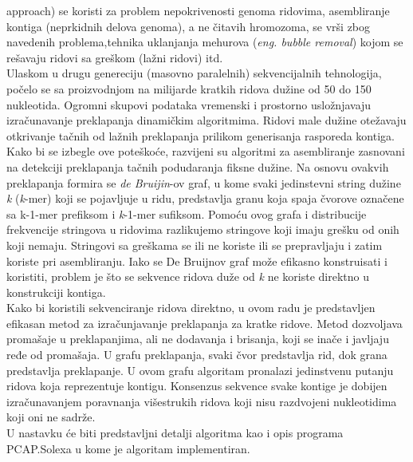 \documentclass[a4paper]{article}
\begin{document}
{{approach}) se koristi za problem nepokrivenosti genoma ridovima, asembliranje kontiga (neprkidnih delova genoma), a ne čitavih hromozoma, se vrši zbog navedenih problema,tehnika uklanjanja mehurova (\textit{eng. bubble removal}) kojom se rešavaju ridovi sa greškom (lažni ridovi) itd. \\
\indent Ulaskom u drugu genereciju (masovno paralelnih) sekvencijalnih tehnologija, počelo se sa proizvodnjom na milijarde kratkih ridova dužine od 50 do 150 nukleotida. Ogromni skupovi podataka vremenski i prostorno usložnjavaju izra\-čuna\-va\-nje preklapanja dinamičkim algoritmima. Ridovi male dužine otežavaju otkrivanje tačnih od lažnih preklapanja prilikom generisanja rasporeda kontiga. Kako bi se izbegle ove poteškoće, razvijeni su algoritmi za asembliranje zasnovani na detekciji preklapanja tačnih podudaranja fiksne dužine. Na osnovu ovakvih preklapanja formira se \textit{de Bruijin}-ov graf, u kome svaki jedinstevni string dužine \textit{k} (\textit{k}-mer) koji se pojavljuje u ridu, predstavlja granu koja spaja čvorove označene sa k-1-mer prefiksom i \textit{k}-1-mer sufiksom. Pomoću ovog grafa i distribucije frekvencije stringova u ridovima razlikujemo stringove koji imaju grešku od onih koji nemaju. Stringovi sa greškama se ili ne koriste ili se prepravljaju i zatim koriste pri asembliranju. Iako se De Bruijnov graf može efikasno konstruisati i koristiti, problem je što se sekvence ridova duže od \textit{k} ne koriste direktno u konstrukciji kontiga.  \\
\indent Kako bi koristili sekvenciranje ridova direktno, u ovom radu je predstavljen efikasan metod za izračunjavanje preklapanja za kratke ridove. Metod dozvoljava promašaje u preklapanjima, ali ne dodavanja i brisanja, koji se inače i javljaju ređe od promašaja. U grafu preklapanja, svaki čvor predstavlja rid, dok grana predstavlja preklapanje. U ovom grafu algoritam pronalazi jedinstvenu putanju ridova koja reprezentuje kontigu. Konsenzus sekvence svake kontige je dobijen izračunavanjem poravnanja višestrukih ridova koji nisu razdvojeni nukleotidima koji oni ne sadrže. \\
\indent U nastavku će biti predstavljni detalji algoritma kao i opis programa PCAP.Solexa u kome je algoritam implementiran.

}
\end{document}

